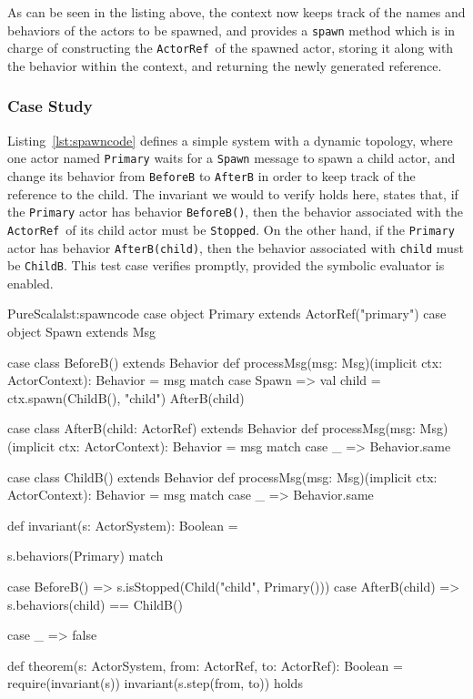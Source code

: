 \documentclass[a4paper,twoside]{article}
\newcommand{\InlineS}[1]{\lstinline[language=PureScala,basicstyle=\small\ttfamily,columns=fixed]|#1|}
\newcommand{\RefCode}[1]{Listing~\ref{#1}}
\newcommand{\ActorRef}{\InlineS{ActorRef}\ }
\newcommand{\stt}[1]{\texttt{\small{#1}}}
\begin{document}
As can be seen in the listing above, the context now keeps track of the names and 
behaviors of the actors to be spawned, and provides a \stt{spawn} method which is in  charge of constructing the \ActorRef of the spawned actor, storing it along with the  behavior within the context, and returning the newly generated reference.

\subsubsection*{Case Study}

\RefCode{lst:spawncode} defines a simple system with a dynamic topology, where one actor named \stt{Primary} waits for a \stt{Spawn} message to spawn a child actor, and change its behavior from \stt{BeforeB} to \stt{AfterB} in order to keep track of the reference to the child. The invariant we would to verify holds here, states that, if the \stt{Primary} actor has behavior \stt{BeforeB()}, then the behavior associated with the \ActorRef of its child actor must be \stt{Stopped}. On the other hand, if the \stt{Primary} actor has behavior \stt{AfterB(child)}, then the behavior associated with \stt{child} must be \stt{ChildB}. This test case verifies promptly, provided the symbolic evaluator is enabled.

\begin{Code}{PureScala}{lst:spawncode}{}
case object Primary extends ActorRef("primary")
case object Spawn extends Msg

case class BeforeB() extends Behavior {
  def processMsg(msg: Msg)(implicit ctx: ActorContext): Behavior = msg match {
    case Spawn =>
      val child = ctx.spawn(ChildB(), "child")
      AfterB(child)
  }
}

case class AfterB(child: ActorRef) extends Behavior {
  def processMsg(msg: Msg)(implicit ctx: ActorContext): Behavior = msg match {
    case _ => Behavior.same
  }
}

case class ChildB() extends Behavior {
  def processMsg(msg: Msg)(implicit ctx: ActorContext): Behavior = msg match {
    case _ => Behavior.same
  }
}

def invariant(s: ActorSystem): Boolean = {
  s.behaviors(Primary) match {
    case BeforeB() =>
      s.isStopped(Child("child", Primary()))
    case AfterB(child) =>
      s.behaviors(child) == ChildB()

    case _ => false
  }
}

def theorem(s: ActorSystem, from: ActorRef, to: ActorRef): Boolean = {
  require(invariant(s))
  invariant(s.step(from, to))
} holds
\end{Code}
\end{document}
